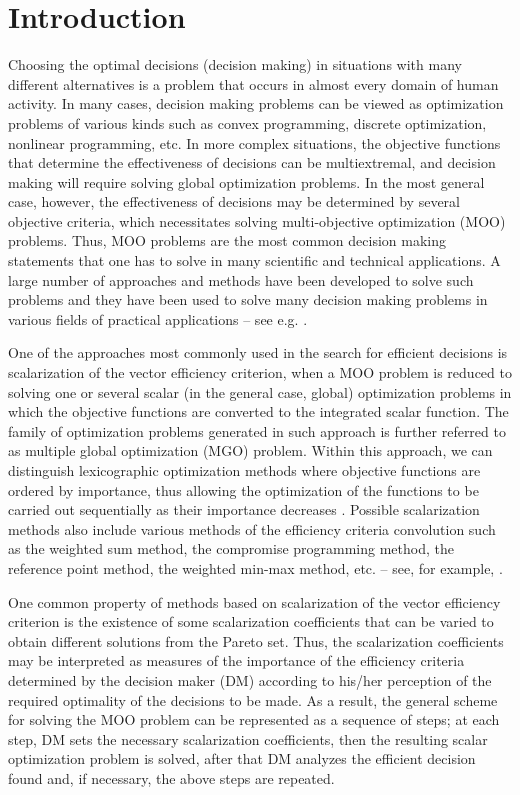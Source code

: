 \documentclass[runningheads]{llncs}
\begin{document}
\section{Introduction} \label{sec:01}


Choosing the optimal decisions (decision making) in situations with many different alternatives is a problem that occurs in almost every domain of human activity. In many cases, decision making problems can be viewed as optimization problems of various kinds such as convex programming, discrete optimization, nonlinear programming, etc. In more complex situations, the objective functions that determine the effectiveness of decisions can be multiextremal, and decision making will require solving global optimization problems. In the most general case, however, the effectiveness of decisions may be determined by several objective criteria, which necessitates solving multi-objective optimization (MOO) problems. Thus, MOO problems are the most common decision making statements that one has to solve in many scientific and technical applications. A large number of approaches and methods have been developed to solve such problems and they have been used to solve many decision making problems in various fields of practical applications -- see e.g. \cite{c1,c2,c3,c4,c5,c6,c7,c8,c9}.

One of the approaches most commonly used in the search for efficient decisions is scalarization of the vector efficiency criterion, when a MOO problem is reduced to solving one or several scalar (in the general case, global) optimization problems in which the objective functions are converted to the integrated scalar function. The family of optimization problems generated in such approach is further referred to as multiple global optimization (MGO) problem. Within this approach, we can distinguish lexicographic optimization methods where objective functions are ordered by importance, thus  allowing the optimization of the functions to be carried out sequentially as their importance decreases \cite{c10}. Possible scalarization methods also include various methods of the efficiency criteria convolution such as the weighted sum method, the compromise programming method, the reference point method, the weighted min-max method, etc. -- see, for example, \cite{c2,c11,c12}. 

One common property of methods based on scalarization of the vector efficiency criterion is the existence of some scalarization coefficients that can be varied to obtain different solutions from the Pareto set. Thus, the scalarization coefficients may be interpreted as measures of the importance of the efficiency criteria determined by the decision maker (DM) according to his/her perception of the required optimality of the decisions to be made. As a result, the general scheme for solving the MOO problem can be represented as a sequence of steps; at each step, DM sets the necessary scalarization coefficients, then the resulting scalar optimization problem is solved, after that DM analyzes the efficient decision found and, if necessary, the above steps are repeated.
\end{document}
